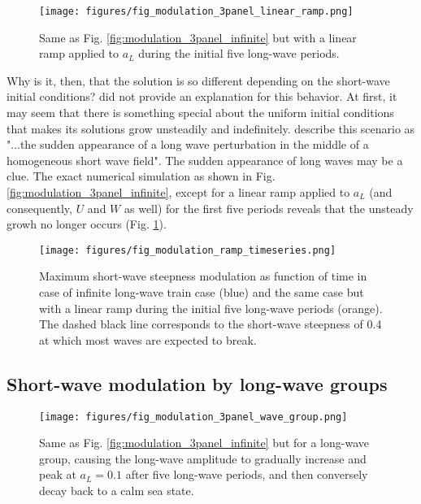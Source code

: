 \documentclass[draft]{agujournal2019}
\begin{document}
\begin{figure}[h]
\label{fig:modulation_3panel_ramp}
\centering
\texttt{[image: figures/fig\_modulation\_3panel\_linear\_ramp.png]}
\caption{
  Same as Fig. \ref{fig:modulation_3panel_infinite} but with a linear ramp
  applied to $a_L$ during the initial five long-wave periods.
}
\end{figure}

Why is it, then, that the solution is so different depending on the short-wave
initial conditions?
 did not provide an explanation for this behavior.
At first, it may seem that there is something special about the uniform initial
conditions that makes its solutions grow unsteadily and indefinitely.
 describe this scenario as "...the sudden appearance
of a long wave perturbation in the middle of a homogeneous short wave field".
The sudden appearance of long waves may be a clue.
The exact numerical simulation as shown in Fig. \ref{fig:modulation_3panel_infinite},
except for a linear ramp applied to $a_L$ (and consequently, $U$ and $W$ as well)
for the first five periods reveals that the unsteady growh no longer occurs
(Fig. \ref{fig:modulation_3panel_ramp}).

\begin{figure}[h]
  \label{fig:unsteady_growth_timeseries}
  \centering
  \texttt{[image: figures/fig\_modulation\_ramp\_timeseries.png]}
  \caption{
    Maximum short-wave steepness modulation as function of time in case of
    infinite long-wave train case (blue) and the same case but with a linear
    ramp during the initial five long-wave periods (orange). The dashed black
    line corresponds to the short-wave steepness of 0.4 at which most waves are
    expected to break.
  }
  \end{figure}

\subsection{Short-wave modulation by long-wave groups}
\label{subsection:wave_groups}

\begin{figure}[h]
\label{fig:modulation_3panel_groups}
\centering
\texttt{[image: figures/fig\_modulation\_3panel\_wave\_group.png]}
\caption{
  Same as Fig. \ref{fig:modulation_3panel_infinite} but for a long-wave group,
  causing the long-wave amplitude to gradually increase and peak at $a_L = 0.1$
  after five long-wave periods, and then conversely decay back to a calm sea state.
}
\end{figure}
\end{document}
